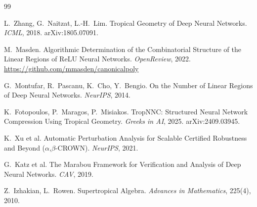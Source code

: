\documentclass[11pt]{article}
\begin{document}
\begin{thebibliography}{99}

L.\ Zhang, G.\ Naitzat, L.-H.\ Lim.
\newblock Tropical Geometry of Deep Neural Networks.
\newblock \emph{ICML}, 2018. arXiv:1805.07091.

M.\ Masden.
\newblock Algorithmic Determination of the Combinatorial Structure of the Linear
Regions of ReLU Neural Networks.
\newblock \emph{OpenReview}, 2022. \url{https://github.com/mmasden/canonicalpoly}

G.\ Montufar, R.\ Pascanu, K.\ Cho, Y.\ Bengio.
\newblock On the Number of Linear Regions of Deep Neural Networks.
\newblock \emph{NeurIPS}, 2014.

K.\ Fotopoulos, P.\ Maragos, P.\ Misiakos.
\newblock TropNNC: Structured Neural Network Compression Using Tropical Geometry.
\newblock \emph{Greeks in AI}, 2025. arXiv:2409.03945.

K.\ Xu et al.
\newblock Automatic Perturbation Analysis for Scalable Certified Robustness and
Beyond ($\alpha$,$\beta$-CROWN).
\newblock \emph{NeurIPS}, 2021.

G.\ Katz et al.
\newblock The Marabou Framework for Verification and Analysis of Deep Neural Networks.
\newblock \emph{CAV}, 2019.

Z.\ Izhakian, L.\ Rowen.
\newblock Supertropical Algebra.
\newblock \emph{Advances in Mathematics}, 225(4), 2010.

\end{thebibliography}
\end{document}
